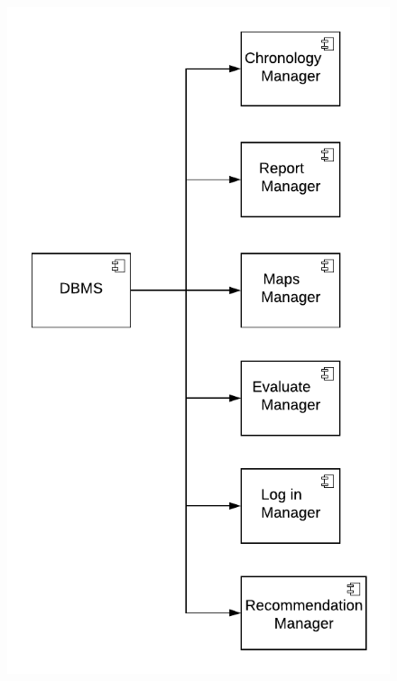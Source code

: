 \documentclass[12pt,a4paper]{report}
\begin{document}
				\begin{figure}[H]
						\includegraphics [center]{DBMS}
						\label{fig: interfaces}
				\end{figure}
				
			
\end{document}
